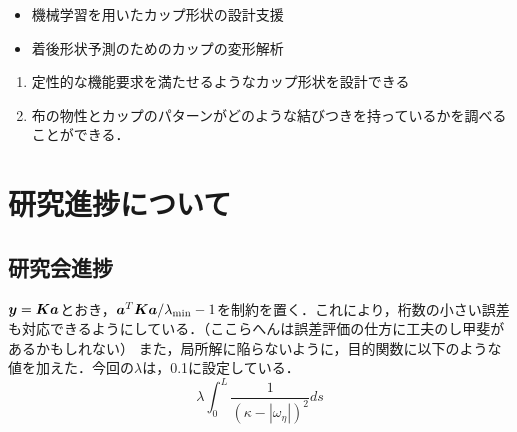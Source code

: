 \documentclass[11pt]{jsarticle}
\begin{document}
	\articleSPRabst
		\begin{itemize}
			\item 機械学習を用いたカップ形状の設計支援
			\item 着後形状予測のためのカップの変形解析
		\end{itemize}
		
		
	\articleSPRobj
		\begin{enumerate}
			\item 定性的な機能要求を満たせるようなカップ形状を設計できる
			\item 布の物性とカップのパターンがどのような結びつきを持っているかを調べることができる．
		\end{enumerate}
	\articleSPRitemsone
		
		\tableofcontents
		
		
	\articleSPRitemstwo
	\renewcommand{\labelitemi}{$\blacktriangledown$}
	\newcommand{\argmax}{\mathop{\rm arg~max}\limits}
	\newcommand{\argmin}{\mathop{\rm arg~min}\limits}
	\newcommand{\Ker}{{\rm Ker}}
	\newcommand{\rank}{{\rm rank}}
	\section{研究進捗について}
		\subsection{研究会進捗}
			$ \boldsymbol{y} = \boldsymbol{K}\boldsymbol{a} $とおき，$ \boldsymbol{a}^T \boldsymbol{K} \boldsymbol{a} / \lambda_{\min} - 1 $を制約を置く．これにより，桁数の小さい誤差も対応できるようにしている．（ここらへんは誤差評価の仕方に工夫のし甲斐があるかもしれない）
			また，局所解に陥らないように，目的関数に以下のような値を加えた．今回の$ \lambda $は，0.1に設定している．
			\begin{equation}
				\lambda \int_{0}^{L} \frac{1}{(\kappa - |\omega_{\eta}|)^2} ds
			\end{equation}
			
\end{document}
